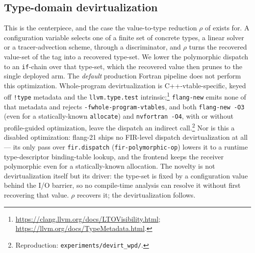 \subsection{Type-domain devirtualization}
This is the centerpiece, and the case the value-to-type reduction $\rho$ of  exists for. A configuration variable selects one of a finite set of concrete types, a linear solver or a tracer-advection scheme, through a discriminator, and $\rho$ turns the recovered value-set of the tag into a recovered type-set. We lower the polymorphic dispatch to an \lstinline[style=fortran]|if|-chain over that type-set, which the recovered value then prunes to the single deployed arm.
The \emph{default} production Fortran pipeline does not perform this optimization. Whole-program devirtualization is C++-vtable-specific, keyed off \texttt{!type} metadata and the \texttt{llvm.type.test} intrinsic;\footnote{\url{https://clang.llvm.org/docs/LTOVisibility.html}; \url{https://llvm.org/docs/TypeMetadata.html}.} \texttt{flang-new} emits none of that metadata and rejects \texttt{-fwhole-program-vtables}, and both \texttt{flang-new -O3} (even for a statically-known \texttt{allocate}) and \texttt{nvfortran -O4}, with or without profile-guided optimization, leave the dispatch an indirect call.\footnote{Reproduction: \texttt{experiments/devirt\_wpd/}.} Nor is this a disabled optimization: flang-21 ships no FIR-level dispatch devirtualization at all --- its only pass over \texttt{fir.dispatch} (\texttt{fir-polymorphic-op}) lowers it to a runtime type-descriptor binding-table lookup, and the frontend keeps the receiver polymorphic even for a statically-known allocation. The novelty is not devirtualization itself but its driver: the type-set is fixed by a configuration value behind the I/O barrier, so no compile-time analysis can resolve it without first recovering that value. $\rho$ recovers it; the devirtualization follows.
